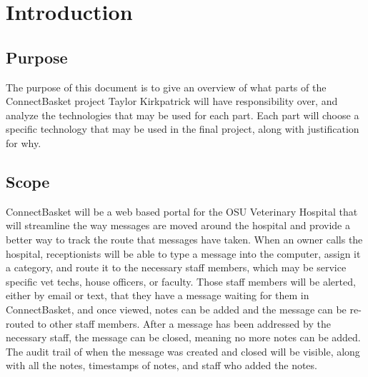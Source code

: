 \documentclass[onecolumn, draftclsnofoot,10pt, compsoc]{IEEEtran}
\begin{document}
\section{Introduction}

\subsection{Purpose}
The purpose of this document is to give an overview of what parts of the ConnectBasket project Taylor Kirkpatrick will have responsibility over,
and analyze the technologies that may be used for each part. Each part will choose a specific technology that may be used in the final project, 
along with justification for why.


\subsection{Scope}
ConnectBasket will be a web based portal for the OSU Veterinary Hospital that will streamline the way messages are moved around the hospital and 
provide a better way to track the route that messages have taken. When an owner calls the hospital, receptionists will be able to type a message 
into the computer, assign it a category, and route it to the necessary staff members, which may be service specific vet techs, house officers, or 
faculty. Those staff members will be alerted, either by email or text, that they have a message waiting for them in ConnectBasket, and once viewed, 
notes can be added and the message can be re-routed to other staff members. After a message has been addressed by the necessary staff, the message 
can be closed, meaning no more notes can be added. The audit trail of when the message was created and closed will be visible, along with all the 
notes, timestamps of notes, and staff who added the notes.
\end{document}
